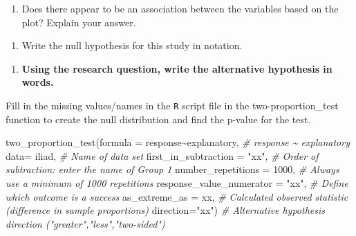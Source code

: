 \documentclass[
]{report}
\newenvironment{Shaded}{\begin{snugshade}}{\end{snugshade}}
\newcommand{\AttributeTok}[1]{\textcolor[rgb]{0.77,0.63,0.00}{#1}}
\newcommand{\CommentTok}[1]{\textcolor[rgb]{0.56,0.35,0.01}{\textit{#1}}}
\newcommand{\DecValTok}[1]{\textcolor[rgb]{0.00,0.00,0.81}{#1}}
\newcommand{\FunctionTok}[1]{\textcolor[rgb]{0.00,0.00,0.00}{#1}}
\newcommand{\NormalTok}[1]{#1}
\newcommand{\SpecialCharTok}[1]{\textcolor[rgb]{0.00,0.00,0.00}{#1}}
\newcommand{\StringTok}[1]{\textcolor[rgb]{0.31,0.60,0.02}{#1}}
\providecommand{\tightlist}{%
  \setlength{\itemsep}{0pt}\setlength{\parskip}{0pt}}
\begin{document}
\begin{enumerate}
\def\labelenumi{\arabic{enumi}.}
\setcounter{enumi}{6}
\tightlist
\item
  Does there appear to be an association between the variables based on the plot? Explain your answer.
\end{enumerate}

\vspace{1in}

\begin{enumerate}
\def\labelenumi{\arabic{enumi}.}
\setcounter{enumi}{7}
\tightlist
\item
  Write the null hypothesis for this study in notation.
\end{enumerate}

\vspace{0.5in}
\newpage

\begin{enumerate}
\def\labelenumi{\arabic{enumi}.}
\setcounter{enumi}{8}
\tightlist
\item
  \textbf{Using the research question, write the alternative hypothesis in words.}
\end{enumerate}

\vspace{1in}

Fill in the missing values/names in the \texttt{R} script file in the two-proportion\_test function to create the null distribution and find the p-value for the test.

\begin{Shaded}
\begin{Highlighting}[]
\FunctionTok{two\_proportion\_test}\NormalTok{(}\AttributeTok{formula =}\NormalTok{ response}\SpecialCharTok{\textasciitilde{}}\NormalTok{explanatory, }\CommentTok{\# response \textasciitilde{} explanatory}
                    \AttributeTok{data=}\NormalTok{ iliad, }\CommentTok{\# Name of data set}
                    \AttributeTok{first\_in\_subtraction =} \StringTok{"xx"}\NormalTok{, }\CommentTok{\# Order of subtraction: enter the name of Group 1}
                    \AttributeTok{number\_repetitions =} \DecValTok{1000}\NormalTok{, }\CommentTok{\# Always use a minimum of 1000 repetitions}
                    \AttributeTok{response\_value\_numerator =} \StringTok{"xx"}\NormalTok{, }\CommentTok{\# Define which outcome is a success }
                    \AttributeTok{as\_extreme\_as =}\NormalTok{ xx, }\CommentTok{\# Calculated observed statistic (difference in sample proportions)}
                    \AttributeTok{direction=}\StringTok{"xx"}\NormalTok{) }\CommentTok{\# Alternative hypothesis direction ("greater","less","two{-}sided")}
\end{Highlighting}
\end{Shaded}
\end{document}
